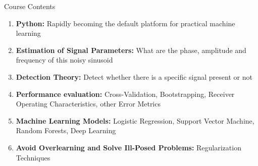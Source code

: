 \documentclass[10pt, aspectratio=169]{beamer} %
\begin{document}
\begin{frame}[allowframebreaks=0.8]
 {Course Contents}
\begin{enumerate}
\item \textbf{Python:} Rapidly becoming the default platform for practical machine learning
\item \textbf{Estimation of Signal Parameters:} What are the phase, amplitude and frequency of this noisy sinusoid
\item \textbf{Detection Theory:} Detect whether there is a specific signal present or not
\item \textbf{Performance evaluation:} Cross-Validation, Bootstrapping, Receiver Operating Characteristics, other Error Metrics
\item \textbf{Machine Learning Models:} Logistic Regression, Support Vector Machine, Random Forests, Deep Learning
\item \textbf{Avoid Overlearning and Solve Ill-Posed Problems:} Regularization Techniques
\end{enumerate}
\end{frame}
\end{document}
